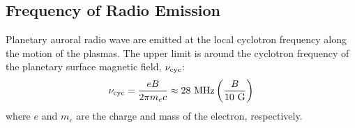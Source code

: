 \documentclass[iop,numberedappendix,apj]{emulateapj}
\begin{document}


\subsection{Frequency of Radio Emission}
\label{ss:model_frequency}

Planetary auroral radio wave are emitted at the local cyclotron frequency along the motion of the plasmas.
The upper limit is around the cyclotron frequency of the planetary surface magnetic field, $\nu_{\rm cyc}$: 
\begin{equation}
\nu_{\rm cyc} = \frac{eB}{2\pi m_e c} \approx 28 {\rm~MHz} \left( \frac{B}{10 \rm~G} \right) \label{eq:fcyc}
\end{equation}
where $e$ and $m_e$ are the charge and mass of the electron, respectively.
\end{document}
